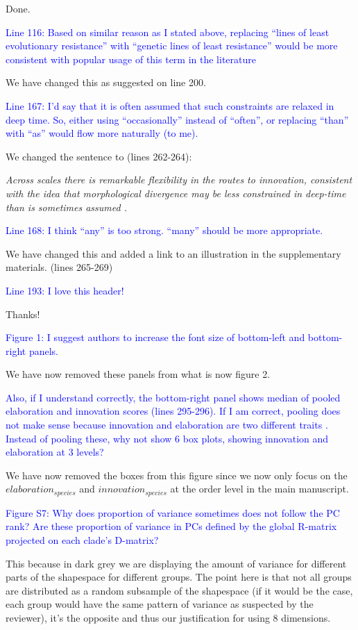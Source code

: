 \documentclass[12pt,letterpaper]{article}
\begin{document}
{Done.

\textcolor{blue}{Line 116: Based on similar reason as I stated above, replacing “lines of least evolutionary resistance” with “genetic lines of least resistance” would be more consistent with popular usage of this term in the literature}

We have changed this as suggested on line 200.

\textcolor{blue}{Line 167: I’d say that it is often assumed that such constraints are relaxed in deep time. So, either using “occasionally” instead of “often”, or replacing “than” with “as” would flow more naturally (to me).}

We changed the sentence to (lines 262-264):

\noindent\textit{Across scales there is remarkable flexibility in the routes to innovation, consistent with the idea that morphological divergence may be less constrained in deep-time than is sometimes assumed \cite{venditti2011multiple}. %
}

\textcolor{blue}{Line 168: I think “any” is too strong. “many” should be more appropriate.}

We have changed this and added a link to an illustration in the supplementary materials. (lines 265-269)

\textcolor{blue}{Line 193: I love this header!}

Thanks!

\textcolor{blue}{Figure 1: I suggest authors to increase the font size of bottom-left and bottom-right panels.}

We have now removed these panels from what is now figure 2.

\textcolor{blue}{Also, if I understand correctly, the bottom-right panel shows median of pooled elaboration and innovation scores (lines 295-296). If I am correct, pooling does not make sense because innovation and elaboration are two different traits . Instead of pooling these, why not show 6 box plots, showing innovation and elaboration at 3 levels?}

We have now removed the boxes from this figure since we now only focus on the $elaboration_{species}$ and $innovation_{species}$ at the order level in the main manuscript.

\textcolor{blue}{Figure S7: Why does proportion of variance sometimes does not follow the PC rank? Are these proportion of variance in PCs defined by the global R-matrix projected on each clade’s D-matrix?}

This because in dark grey we are displaying the amount of variance for different parts of the shapespace for different groups. The point here is that not all groups are distributed as a random subsample of the shapespace (if it would be the case, each group would have the same pattern of variance as suspected by the reviewer), it’s the opposite and thus our justification for using 8 dimensions.

}
\end{document}
